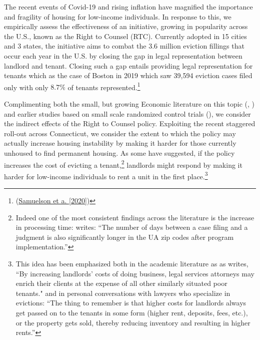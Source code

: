 \documentclass[a4paper,12pt]{article}
\begin{document}
The recent events of Covid-19 and rising inflation have magnified the importance and fragility of housing for low-income individuals. In response to this, we empirically assess the effectiveness of an initiative, growing in popularity across the U.S., known as the Right to Counsel (RTC). Currently adopted in 15 cities and 3 states, the initiative aims to combat the 3.6 million eviction fillings that occur each year in the U.S. by closing the gap in legal representation between landlord and tenant. Closing such a gap entails providing legal representation for tenants which as the case of Boston in 2019 which saw 39,594 eviction cases filed only  with only $8.7\%$ of tenants represented.\footnote{(\href{https://bostonbar.org/app/uploads/2022/06/rtc-report-for-web-or-email.pdf}{Samuelson et a. [2020]})}

 Complimenting both the small, but growing Economic literature on this topic (\cite{abramson2021welfare}, \cite{cassidy2022effects}) and earlier studies based on small scale randomized control trials (\cite{seron2001impact}), we consider the indirect effects of the Right to Counsel policy. Exploiting the recent staggered roll-out across Connecticut, we consider the extent to which the policy may actually increase housing instability by making it harder for those currently unhoused to find permanent housing. As some have suggested, if the policy increases the cost of evicting a tenant,\footnote{Indeed one of the most consistent findings across the literature is the increase in processing time: \cite{cassidy2022effects} writes: ``The number of days between a case filing and a judgment is also significantly longer in the UA zip codes after program implementation.''} landlords might respond by making it harder for low-income individuals to rent a unit in the first place.\footnote{This idea has been emphasized both in the academic literature as as \cite{gunn1995eviction} writes, ``By increasing landlords' costs of doing business, legal services attorneys may enrich their clients at the expense of all other similarly situated poor tenants."  and in personal conversations with lawyers who specialize in evictions: ``The thing to remember is that higher costs for landlords always get passed on to the tenants in some form (higher rent, deposits, fees, etc.), or the property gets sold, thereby reducing inventory and resulting in higher rents.''}
\end{document}
